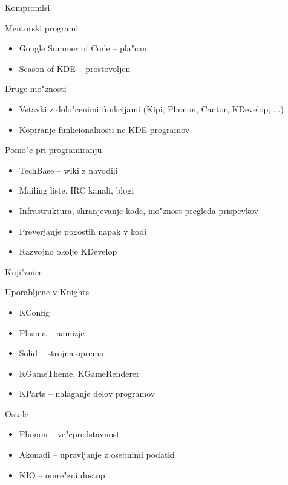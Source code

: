 \documentclass{beamer}
\begin{document}
\begin{frame}{Kompromisi}
\begin{block}{Mentorski programi}
\begin{itemize}
 \item Google Summer of Code -- pla"can
 \item Season of KDE -- prostovoljen
\end{itemize}
\end{block}
\begin{block}{Druge mo"znosti}
\begin{itemize}
 \item Vstavki z dolo"cenimi funkcijami (Kipi, Phonon, Cantor, KDevelop, ...)
 \item Kopiranje funkcionalnosti ne-KDE programov
\end{itemize}
\end{block}
\end{frame}

\begin{frame}{Pomo"c pri programiranju}
 \begin{itemize}
  \item TechBase -- wiki z navodili
  \item Mailing liste, IRC kanali, blogi
  \item Infrastruktura, shranjevanje kode, mo"znost pregleda prispevkov
  \item Preverjanje pogostih napak v kodi
  \item Razvojno okolje KDevelop
 \end{itemize}
\end{frame}

\begin{frame}{Knji"znice}
 \begin{block}{Uporabljene v Knights}
  \begin{itemize}
   \item KConfig
  \item Plasma -- namizje
  \item Solid -- strojna oprema
  \item KGameTheme, KGameRenderer
  \item KParts -- nalaganje delov programov
  \end{itemize}

 \end{block}
 \begin{block}{Ostale}
  \begin{itemize}
   \item Phonon -- ve"cpredstavnost
   \item Akonadi -- upravljanje z osebnimi podatki
  \item KIO -- omre"zni dostop
  \end{itemize}
 \end{block}
\end{frame}
\end{document}

